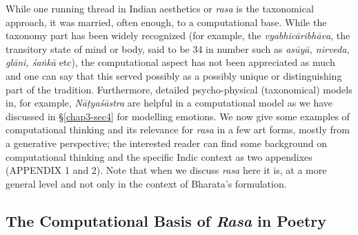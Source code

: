 While one running thread in Indian aesthetics or \textsl{rasa} is the taxonomical approach, it was married, often enough, to a computational base. While the taxonomy part has been widely recognized (for example, the \textsl{vyabhicāribhāva}, the transitory state of mind or body, said to be 34 in number such as \textsl{asūyā, nirveda, glāni, śaṅkā} etc), the computational aspect has not been appreciated as much and one can say that this served possibly as a possibly unique or distinguishing part of the tradition. Furthermore, detailed psycho-physical (taxonomical) models in, for example, \textsl{Nāṭyaśāstra} are helpful in a computational model as we have discussed in \S\ref{chap3-sec4} for modelling emotions. We now give some examples of computational thinking and its relevance for \textsl{rasa} in a few art forms, mostly from a generative perspective; the interested reader can find some background on computational thinking and the specific Indic context as two appendixes (APPENDIX 1 and 2). Note that when we discuss \textsl{rasa} here it is, at a more general level and not only in the context of Bharata’s formulation.\\[-20pt]

\subsection{The Computational Basis of \textsl{Rasa} in Poetry}\label{chap3-sec5.1}

